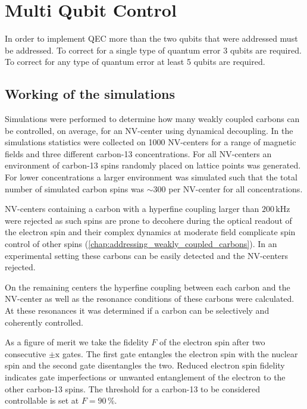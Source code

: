 \section{Multi Qubit Control}
In order to implement QEC more than the two qubits that were addressed must be addressed.
To correct for a single type of quantum error 3 qubits are required.
To correct for any type of quantum error at least 5 qubits are required.


\subsection{Working of the simulations}
Simulations were performed to determine how many weakly coupled carbons can be controlled, on average, for an NV-center using dynamical decoupling.
In the simulations statistics were collected on 1000 NV-centers for a range of magnetic fields and three different carbon-13 concentrations.
For all NV-centers an environment of carbon-13 spins randomly placed on lattice points was generated.
For lower concentrations a larger environment was simulated such that the total number of simulated carbon spins was $\sim 300$ per NV-center for all concentrations.

NV-centers containing a carbon with a hyperfine coupling larger than $200\,\mathrm{kHz}$ were rejected as such spins are prone to decohere during the optical readout of the electron spin and their complex dynamics at moderate field complicate spin control of other spins (\cref{chap:addressing_weakly_coupled_carbons}).
In an experimental setting these carbons can be easily detected and the NV-centers rejected.

On the remaining centers the hyperfine coupling between each carbon and the NV-center as well as the resonance conditions of these carbons were calculated.
At these resonances it was determined if a carbon can be selectively and coherently controlled.

As a figure of merit we take the fidelity $F$ of the electron spin after two consecutive $\pm \mathrm{x}$ gates.
The first gate entangles the electron spin with the nuclear spin and the second gate disentangles the two.
Reduced electron spin fidelity indicates gate imperfections or unwanted entanglement of the electron to the other carbon-13 spins.
The threshold for a carbon-13 to be considered controllable is set at $F = 90 \, \%$.

